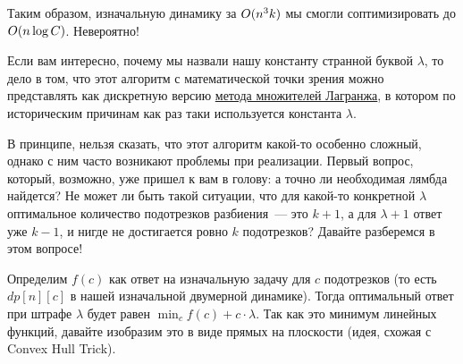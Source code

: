 Таким образом, изначальную динамику за $O(n^3 k)$ мы смогли соптимизировать до $O(n \log C)$. Невероятно!

\begin{observation}
    Если вам интересно, почему мы назвали нашу константу странной буквой $\lambda$, то дело в том, что этот алгоритм с математической точки зрения можно представлять как дискретную версию \href{https://ru.wikipedia.org/wiki/%D0%9C%D0%B5%D1%82%D0%BE%D0%B4_%D0%BC%D0%BD%D0%BE%D0%B6%D0%B8%D1%82%D0%B5%D0%BB%D0%B5%D0%B9_%D0%9B%D0%B0%D0%B3%D1%80%D0%B0%D0%BD%D0%B6%D0%B0}{метода множителей Лагранжа}, в котором по историческим причинам как раз таки используется константа $\lambda$.
\end{observation}

В принципе, нельзя сказать, что этот алгоритм какой-то особенно сложный, однако с ним часто возникают проблемы при реализации. Первый вопрос, который, возможно, уже пришел к вам в голову: а точно ли необходимая лямбда найдется? Не может ли быть такой ситуации, что для какой-то конкретной $\lambda$ оптимальное количество подотрезков разбиения~--- это $k + 1$, а для $\lambda + 1$ ответ уже $k - 1$, и нигде не достигается ровно $k$ подотрезков? Давайте разберемся в этом вопросе!

Определим $f(c)$ как ответ на изначальную задачу для $c$ подотрезков (то есть $dp[n][c]$ в нашей изначальной двумерной динамике). Тогда оптимальный ответ при штрафе $\lambda$ будет равен $\min_{c} f(c) + c \cdot \lambda$. Так как это минимум линейных функций, давайте изобразим это в виде прямых на плоскости (идея, схожая с Convex Hull Trick).



